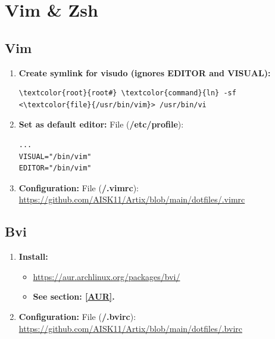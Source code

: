 \documentclass[10pt, a4paper, onecolumn, oneside, titlepage, openany]{book}
\begin{document}
\chapter{Vim \& Zsh}
\section{Vim}
\begin{enumerate}
    \item \textbf{Create symlink for visudo (ignores EDITOR and VISUAL):}
\begin{Verbatim}[commandchars=\\\{\}]
\textcolor{root}{root#} \textcolor{command}{ln} -sf <\textcolor{file}{/usr/bin/vim}> /usr/bin/vi
\end{Verbatim}
    \item \textbf{Set as default editor:}
\newline File (\textbf{\textcolor{file}{/etc/profile}}):
\begin{Verbatim}[commandchars=\\\{\}]
...
VISUAL="/bin/vim"
EDITOR="/bin/vim"
\end{Verbatim}
    \item \textbf{Configuration:}
\newline File (\textbf{\textcolor{file}{\texttildelow/.vimrc}}):
\newline \url{https://github.com/AISK11/Artix/blob/main/dotfiles/.vimrc}
\end{enumerate}

\section{Bvi}
\begin{enumerate}
    \item \textbf{Install:}
    \begin{itemize}
        \item \url{https://aur.archlinux.org/packages/bvi/}
        \item \textbf{See section: \underline{\ref{AUR}}.}
    \end{itemize}
    \item \textbf{Configuration:}
\newline File (\textbf{\textcolor{file}{\texttildelow/.bvirc}}):
\newline \url{https://github.com/AISK11/Artix/blob/main/dotfiles/.bvirc}
\end{enumerate}
\end{document}
